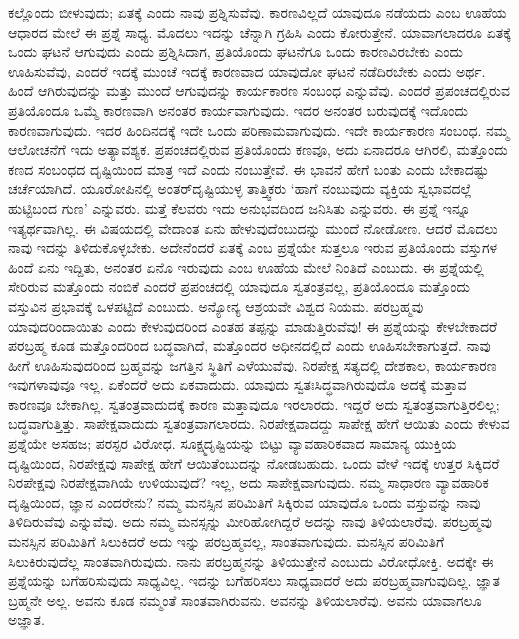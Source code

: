 ಕಲ್ಲೊಂದು ಬೀಳುವುದು; ಏತಕ್ಕೆ ಎಂದು ನಾವು ಪ್ರಶ್ನಿಸುವೆವು. ಕಾರಣವಿಲ್ಲದೆ ಯಾವುದೂ ನಡೆಯದು ಎಂಬ ಊಹೆಯ ಆಧಾರದ ಮೇಲೆ ಈ ಪ್ರಶ್ನೆ ಸಾಧ್ಯ. ಮೊದಲು ಇದನ್ನು ಚೆನ್ನಾಗಿ ಗ್ರಹಿಸಿ ಎಂದು ಕೋರುತ್ತೇನೆ. ಯಾವಾಗಲಾದರೂ ಏತಕ್ಕೆ ಒಂದು ಘಟನೆ ಆಗುವುದು ಎಂದು ಪ್ರಶ್ನಿಸಿದಾಗ, ಪ್ರತಿಯೊಂದು ಘಟನೆಗೂ ಒಂದು ಕಾರಣವಿರಬೇಕು ಎಂದು ಊಹಿಸುವೆವು, ಎಂದರೆ ಇದಕ್ಕೆ ಮುಂಚೆ ಇದಕ್ಕೆ ಕಾರಣವಾದ ಯಾವುದೋ ಘಟನೆ ನಡೆದಿರಬೇಕು ಎಂದು ಅರ್ಥ. ಹಿಂದೆ ಆಗಿರುವುದನ್ನು ಮತ್ತು ಮುಂದೆ ಆಗುವುದನ್ನು ಕಾರ್ಯಕಾರಣ ಸಂಬಂಧ ಎನ್ನುವೆವು. ಎಂದರೆ ಪ್ರಪಂಚದಲ್ಲಿರುವ ಪ್ರತಿಯೊಂದೂ ಒಮ್ಮೆ ಕಾರಣವಾಗಿ ಅನಂತರ ಕಾರ್ಯವಾಗುವುದು. ಇದರ ಅನಂತರ ಬರುವುದಕ್ಕೆ ಇದೊಂದು ಕಾರಣವಾಗುವುದು. ಇದರ ಹಿಂದಿನದಕ್ಕೆ ಇದೇ ಒಂದು ಪರಿಣಾಮವಾಗುವುದು. ಇದೇ ಕಾರ್ಯಕಾರಣ ಸಂಬಂಧ. ನಮ್ಮ ಆಲೋಚನೆಗೆ ಇದು ಅತ್ಯಾವಶ್ಯಕ. ಪ್ರಪಂಚದಲ್ಲಿರುವ ಪ್ರತಿಯೊಂದು ಕಣವೂ, ಅದು ಏನಾದರೂ ಆಗಿರಲಿ, ಮತ್ತೊಂದು ಕಣದ ಸಂಬಂಧದ ದೃಷ್ಟಿಯಿಂದ ಮಾತ್ರ ಇದೆ ಎಂದು ನಂಬುತ್ತೇವೆ. ಈ ಭಾವನೆ ಹೇಗೆ ಬಂತು ಎಂದು ಬೇಕಾದಷ್ಟು ಚರ್ಚೆಯಾಗಿದೆ. ಯೂರೋಪಿನಲ್ಲಿ ಅಂತರ್​ದೃಷ್ಟಿಯುಳ್ಳ ತಾತ್ತ್ವಿಕರು ‘ಹಾಗೆ ನಂಬುವುದು ವ್ಯಕ್ತಿಯ ಸ್ವಭಾವದಲ್ಲೆ ಹುಟ್ಟಿಬಂದ ಗುಣ’ ಎನ್ನುವರು. ಮತ್ತೆ ಕೆಲವರು ಇದು ಅನುಭವದಿಂದ ಜನಿಸಿತು ಎನ್ನುವರು. ಈ ಪ್ರಶ್ನೆ ಇನ್ನೂ ಇತ್ಯರ್ಥವಾಗಿಲ್ಲ. ಈ ವಿಷಯದಲ್ಲಿ ವೇದಾಂತ ಏನು ಹೇಳುವುದೆಂಬುದನ್ನು ಮುಂದೆ ನೋಡೋಣ. ಆದರೆ ಮೊದಲು ನಾವು ಇದನ್ನು ತಿಳಿದುಕೊಳ್ಳಬೇಕು. ಅದೇನೆಂದರೆ ಏತಕ್ಕೆ ಎಂಬ ಪ್ರಶ್ನೆಯೇ ಸುತ್ತಲೂ ಇರುವ ಪ್ರತಿಯೊಂದು ವಸ್ತುಗಳ ಹಿಂದೆ ಏನು ಇದ್ದಿತು, ಅನಂತರ ಏನೊ ಇರುವುದು ಎಂಬ ಊಹೆಯ ಮೇಲೆ ನಿಂತಿದೆ ಎಂಬುದು. ಈ ಪ್ರಶ್ನೆಯಲ್ಲಿ ಸೇರಿರುವ ಮತ್ತೊಂದು ನಂಬಿಕೆ ಎಂದರೆ ಪ್ರಪಂಚದಲ್ಲಿ ಯಾವುದೂ ಸ್ವತಂತ್ರವಲ್ಲ, ಪ್ರತಿಯೊಂದೂ ಮತ್ತೊಂದು ವಸ್ತುವಿನ ಪ್ರಭಾವಕ್ಕೆ ಒಳಪಟ್ಟಿದೆ ಎಂಬುದು. ಅನ್ಯೋನ್ಯ ಆಶ್ರಯವೇ ವಿಶ್ವದ ನಿಯಮ. ಪರಬ್ರಹ್ಮವು ಯಾವುದರಿಂದಾಯಿತು ಎಂದು ಕೇಳುವುದರಿಂದ ಎಂತಹ ತಪ್ಪನ್ನು ಮಾಡುತ್ತಿರುವೆವು! ಈ ಪ್ರಶ್ನೆಯನ್ನು ಕೇಳಬೇಕಾದರೆ ಪರಬ್ರಹ್ಮ ಕೂಡ ಮತ್ತೊಂದರಿಂದ ಬದ್ಧವಾಗಿದೆ, ಮತ್ತೊಂದರ ಅಧೀನದಲ್ಲಿದೆ ಎಂದು ಊಹಿಸಬೇಕಾಗುತ್ತದೆ. ನಾವು ಹೀಗೆ ಊಹಿಸುವುದರಿಂದ ಬ್ರಹ್ಮವನ್ನು ಜಗತ್ತಿನ ಸ್ಥಿತಿಗೆ ಎಳೆಯುವೆವು. ನಿರಪೇಕ್ಷ ಸತ್ಯದಲ್ಲಿ ದೇಶಕಾಲ, ಕಾರ್ಯಕಾರಣ ಇವುಗಳಾವುವೂ ಇಲ್ಲ. ಏಕೆಂದರೆ ಅದು ಏಕವಾದುದು. ಯಾವುದು ಸ್ವತಃಸಿದ್ಧವಾಗಿರುವುದೊ ಅದಕ್ಕೆ ಮತ್ತಾವ ಕಾರಣವೂ ಬೇಕಾಗಿಲ್ಲ. ಸ್ವತಂತ್ರವಾದುದಕ್ಕೆ ಕಾರಣ ಮತ್ತಾವುದೂ ಇರಲಾರದು. ಇದ್ದರೆ ಅದು ಸ್ವತಂತ್ರವಾಗುತ್ತಿರಲಿಲ್ಲ; ಬದ್ಧವಾಗುತ್ತಿತ್ತು. ಸಾಪೇಕ್ಷವಾದುದು ಸ್ವತಂತ್ರವಾಗಲಾರದು. ನಿರಪೇಕ್ಷವಾದದ್ದು ಸಾಪೇಕ್ಷ ಹೇಗೆ ಆಯಿತು ಎಂದು ಕೇಳುವ ಪ್ರಶ್ನೆಯೇ ಅಸಹಜ; ಪರಸ್ಪರ ವಿರೋಧ. ಸೂಕ್ಷ್ಮದೃಷ್ಟಿಯನ್ನು ಬಿಟ್ಟು ವ್ಯಾವಹಾರಿಕವಾದ ಸಾಮಾನ್ಯ ಯುಕ್ತಿಯ ದೃಷ್ಟಿಯಿಂದ, ನಿರಪೇಕ್ಷವು ಸಾಪೇಕ್ಷ ಹೇಗೆ ಆಯಿತೆಂಬುದನ್ನು ನೋಡಬಹುದು. ಒಂದು ವೇಳೆ ಇದಕ್ಕೆ ಉತ್ತರ ಸಿಕ್ಕಿದರೆ ನಿರಪೇಕ್ಷವು ನಿರಪೇಕ್ಷವಾಗಿಯೆ ಉಳಿಯುವುದೆ? ಇಲ್ಲ, ಅದು ಸಾಪೇಕ್ಷವಾಗುವುದು. ನಮ್ಮ ಸಾಧಾರಣ ವ್ಯಾವಹಾರಿಕ ದೃಷ್ಟಿಯಿಂದ, ಜ್ಞಾನ ಎಂದರೇನು? ನಮ್ಮ ಮನಸ್ಸಿನ ಪರಿಮಿತಿಗೆ ಸಿಕ್ಕಿರುವ ಯಾವುದೊ ಒಂದು ವಸ್ತುವನ್ನು ನಾವು ತಿಳಿದಿರುವೆವು ಎನ್ನುವೆವು. ಅದು ನಮ್ಮ ಮನಸ್ಸನ್ನು ಮೀರಿಹೋಗಿದ್ದರೆ ಅದನ್ನು ನಾವು ತಿಳಿಯಲಾರೆವು. ಪರಬ್ರಹ್ಮವು ಮನಸ್ಸಿನ ಪರಿಮಿತಿಗೆ ಸಿಲುಕಿದರೆ ಅದು ಇನ್ನು ಪರಬ್ರಹ್ಮವಲ್ಲ, ಸಾಂತವಾಗುವುದು. ಮನಸ್ಸಿನ ಪರಿಮಿತಿಗೆ ಸಿಲುಕಿರುವುದೆಲ್ಲ ಸಾಂತವಾಗಿರುವುದು. ನಾನು ಪರಬ್ರಹ್ಮನನ್ನು ತಿಳಿಯುತ್ತೇನೆ ಎಂಬುದು ವಿರೋಧೋಕ್ತಿ. ಅದಕ್ಕೇ ಈ ಪ್ರಶ್ನೆಯನ್ನು ಬಗೆಹರಿಸುವುದು ಸಾಧ್ಯವಿಲ್ಲ. ಇದನ್ನು ಬಗೆಹರಿಸಲು ಸಾಧ್ಯವಾದರೆ ಅದು ಪರಬ್ರಹ್ಮವಾಗುವುದಿಲ್ಲ. ಜ್ಞಾತ ಬ್ರಹ್ಮನೇ ಅಲ್ಲ. ಅವನು ಕೂಡ ನಮ್ಮಂತೆ ಸಾಂತವಾಗಿರುವನು. ಅವನನ್ನು ತಿಳಿಯಲಾರೆವು. ಅವನು ಯಾವಾಗಲೂ ಅಜ್ಞಾತ.

